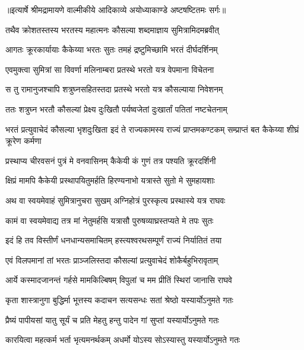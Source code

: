 {॥इत्यार्षे श्रीमद्रामायणे वाल्मीकीये आदिकाव्ये अयोध्याकाण्डे अष्टषष्टितमः सर्गः॥}


\twolineshloka
{तथैव क्रोशतस्तस्य भरतस्य महात्मनः}
{कौसल्या शब्दमाज्ञाय सुमित्रामिदमब्रवीत्} %

\twolineshloka
{आगतः क्रूरकार्यायाः कैकेय्या भरतः सुतः}
{तमहं द्रष्टुमिच्छामि भरतं दीर्घदर्शिनम्} %

\twolineshloka
{एवमुक्त्वा सुमित्रां सा विवर्णा मलिनाम्बरा}
{प्रतस्थे भरतो यत्र वेपमाना विचेतना} %

\twolineshloka
{स तु रामानुजश्चापि शत्रुघ्नसहितस्तदा}
{प्रतस्थे भरतो यत्र कौसल्याया निवेशनम्} %

\twolineshloka
{ततः शत्रुघ्न भरतौ कौसल्यां प्रेक्ष्य दुःखितौ}
{पर्यष्वजेतां दुःखार्तां पतितां नष्टचेतनाम्} %

\threelineshloka
{भरतं प्रत्युवाचेदं कौसल्या भृशदुःखिता}
{इदं ते राज्यकामस्य राज्यं प्राप्तमकण्टकम्}
{सम्प्राप्तं बत कैकेय्या शीघ्रं क्रूरेण कर्मणा} %

\twolineshloka
{प्रस्थाप्य चीरवसनं पुत्रं मे वनवासिनम्}
{कैकेयी कं गुणं तत्र पश्यति क्रूरदर्शिनी} %

\twolineshloka
{क्षिप्रं मामपि कैकेयी प्रस्थापयितुमर्हति}
{हिरण्यनाभो यत्रास्ते सुतो मे सुमहायशाः} %

\twolineshloka
{अथ वा स्वयमेवाहं सुमित्रानुचरा सुखम्}
{अग्निहोत्रं पुरस्कृत्य प्रस्थास्ये यत्र राघवः} %

\twolineshloka
{कामं वा स्वयमेवाद्य तत्र मां नेतुमर्हसि}
{यत्रासौ पुरुषव्याघ्रस्तप्यते मे तपः सुतः} %

\twolineshloka
{इदं हि तव विस्तीर्णं धनधान्यसमाचितम्}
{हस्त्यश्वरथसम्पूर्णं राज्यं निर्यातितं तया} %

\twolineshloka
{एवं विलपमानां तां भरतः प्राञ्जलिस्तदा}
{कौसल्यां प्रत्युवाचेदं शोकैर्बहुभिरावृताम्} %

\twolineshloka
{आर्ये कस्मादजानन्तं गर्हसे मामकिल्बिषम्}
{विपुलां च मम प्रीतिं स्थिरां जानासि राघवे} %

\twolineshloka
{कृता शास्त्रानुगा बुद्धिर्मा भूत्तस्य कदाचन}
{सत्यसन्धः सतां श्रेष्ठो यस्यार्योऽनुमते गतः} %

\twolineshloka
{प्रैष्यं पापीयसां यातु सूर्यं च प्रति मेहतु}
{हन्तु पादेन गां सुप्तां यस्यार्योऽनुमते गतः} %

\twolineshloka
{कारयित्वा महत्कर्म भर्ता भृत्यमनर्थकम्}
{अधर्मो योऽस्य सोऽस्यास्तु यस्यार्योऽनुमते गतः} %

